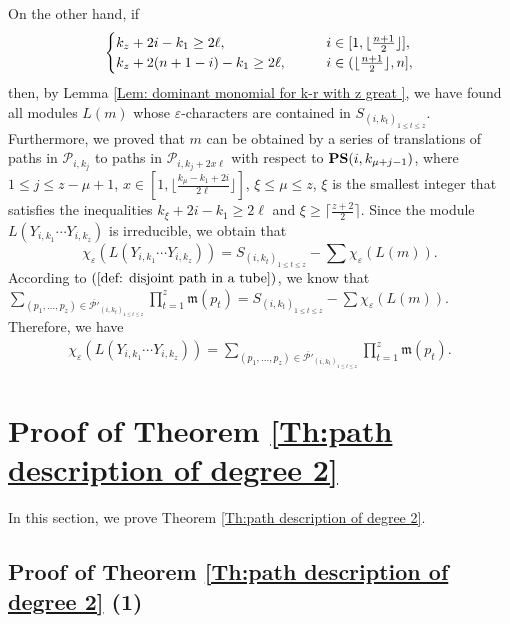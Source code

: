 \documentclass[12pt, reqno]{amsart}
\numberwithin{equation}{section}
\begin{document}
{On the other hand, if
\begin{align*}
\begin{cases} k_z+2i-k_1\geq 2 \ell, & {\hskip 2em} i\in [1, \lfloor \frac{n+1}2 \rfloor],\\
              k_z+2(n+1-i)-k_1\geq 2 \ell, & {\hskip 2em} i\in (\lfloor \frac{n+1}2 \rfloor, n],
\end{cases}
\end{align*}
then, by Lemma \ref{Lem: dominant monomial for k-r with z great }, we have found all modules $L(m)$ whose $\varepsilon$-characters are contained in $S_{(i,k_t)_{1 \leq t \leq z}}$. Furthermore, we proved that $m$ can be obtained by a series of translations of paths in $\mathscr{P}_{i,k_j}$ to paths in $\mathscr{P}_{i,k_j+2x \ell}$ with respect to ${\bf PS}(i,k_{\mu+j-1})$, where $1\leq j\leq z-\mu+1$, $x\in[1,\lfloor\frac{k_\mu-k_1+2i}{2 \ell}\rfloor]$, $\xi \leq \mu\leq z$, $\xi$ is the smallest integer that satisfies the inequalities $k_\xi+2i-k_1\geq 2 \ell$ and $\xi \geq \lceil \frac{z+2}2 \rceil$.
Since the module $L(Y_{i,k_1}\cdots Y_{i,k_z})$ is irreducible, we obtain that
\[
\chi_{\varepsilon}(L(Y_{i, k_1}\cdots Y_{i, k_z}))=S_{(i,k_t)_{1 \leq t \leq z}}-\sum\chi_{\varepsilon}(L(m)).
\]
According to $(\ref{def: disjoint path in a tube})$, we know that
$\sum_{(p_{1}, \ldots, p_{z}) \in \overline{\mathscr{P'}}_{(i, k_t)_{1 \leq t \leq z}}} \prod_{t=1}^{z}\mathfrak{m}(p_{t})=S_{(i,k_t)_{1 \leq t \leq z}}-\sum\chi_{\varepsilon}(L(m))$.
Therefore, we have
\begin{align*}
\chi_{\varepsilon}(L(Y_{i, k_1}\cdots Y_{i, k_z}))=\sum_{(p_{1}, \ldots, p_{z}) \in \overline{\mathscr{P'}}_{(i, k_{t})_{1 \leq t \leq z}}} \prod_{t=1}^{z}\mathfrak{m}(p_{t}).
\end{align*}


\section{Proof of Theorem \ref{Th:path description of degree 2}}\label{Sec: prove the th path description of degree 2}
In this section, we prove Theorem \ref{Th:path description of degree 2}.

\subsection{Proof of Theorem \ref{Th:path description of degree 2} (1)}

}
\end{document}
